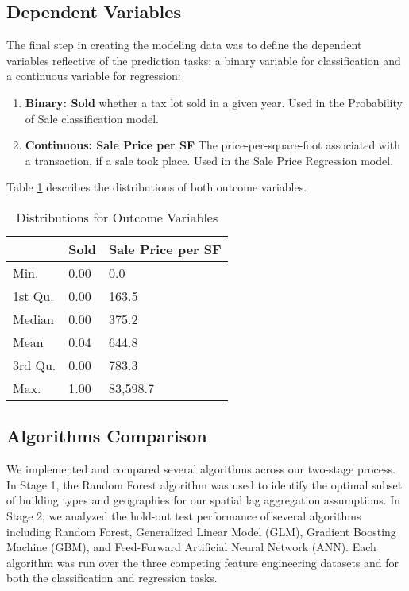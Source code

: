 \documentclass[12pt,]{article}
\providecommand{\tightlist}{%
  \setlength{\itemsep}{0pt}\setlength{\parskip}{0pt}}
\begin{document}
\hypertarget{dependent-variables}{%
\subsection{Dependent Variables}\label{dependent-variables}}

The final step in creating the modeling data was to define the dependent
variables reflective of the prediction tasks; a binary variable for
classification and a continuous variable for regression:

\begin{enumerate}
\def\labelenumi{\arabic{enumi})}
\tightlist
\item
  \textbf{Binary: Sold} whether a tax lot sold in a given year. Used in
  the Probability of Sale classification model.
\item
  \textbf{Continuous: Sale Price per SF} The price-per-square-foot
  associated with a transaction, if a sale took place. Used in the Sale
  Price Regression model.
\end{enumerate}

\noindent Table \ref{tab:OutcomeDistro} describes the distributions of
both outcome variables.

\begin{table}

\caption{\label{tab:table 4}\label{tab:OutcomeDistro} Distributions for Outcome Variables}
\centering
\begin{tabular}[t]{lll}
\toprule
  & Sold & Sale Price per SF\\
\midrule
Min. & 0.00 & 0.0\\
1st Qu. & 0.00 & 163.5\\
Median & 0.00 & 375.2\\
Mean & 0.04 & 644.8\\
3rd Qu. & 0.00 & 783.3\\
Max. & 1.00 & 83,598.7\\
\bottomrule
\end{tabular}
\end{table}

\hypertarget{algorithms-comparison}{%
\subsection{Algorithms Comparison}\label{algorithms-comparison}}

We implemented and compared several algorithms across our two-stage
process. In Stage 1, the Random Forest algorithm was used to identify
the optimal subset of building types and geographies for our spatial lag
aggregation assumptions. In Stage 2, we analyzed the hold-out test
performance of several algorithms including Random Forest, Generalized
Linear Model (GLM), Gradient Boosting Machine (GBM), and Feed-Forward
Artificial Neural Network (ANN). Each algorithm was run over the three
competing feature engineering datasets and for both the classification
and regression tasks.
\end{document}
